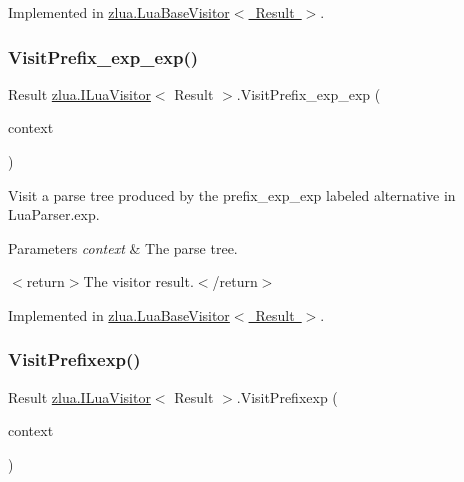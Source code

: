 Implemented in \mbox{\hyperlink{classzlua_1_1_lua_base_visitor_a2dc2a658f068fc6064d256d3c19b1b0d}{zlua.\+Lua\+Base\+Visitor$<$ Result $>$}}.

\mbox{\label{interfacezlua_1_1_i_lua_visitor_a8183a0ec15a6a77848310e5ea034e45d}} 
\subsubsection{\texorpdfstring{Visit\+Prefix\+\_\+exp\+\_\+exp()}{VisitPrefix\_exp\_exp()}}
{\footnotesize\ttfamily Result \mbox{\hyperlink{interfacezlua_1_1_i_lua_visitor}{zlua.\+I\+Lua\+Visitor}}$<$ Result $>$.Visit\+Prefix\+\_\+exp\+\_\+exp (\begin{DoxyParamCaption}\item[{\mbox{[}\+Not\+Null\mbox{]} \mbox{\hyperlink{classzlua_1_1_lua_parser_1_1_prefix__exp__exp_context}{Lua\+Parser.\+Prefix\+\_\+exp\+\_\+exp\+Context}}}]{context }\end{DoxyParamCaption})}



Visit a parse tree produced by the {\ttfamily prefix\+\_\+exp\+\_\+exp} labeled alternative in Lua\+Parser.\+exp. 


\begin{DoxyParams}{Parameters}
{\em context} & The parse tree.\\
\hline
\end{DoxyParams}
$<$return$>$The visitor result.$<$/return$>$ 

Implemented in \mbox{\hyperlink{classzlua_1_1_lua_base_visitor_a77ce0adce8dcce58ae649a008ff905bc}{zlua.\+Lua\+Base\+Visitor$<$ Result $>$}}.

\mbox{\label{interfacezlua_1_1_i_lua_visitor_a76880eb7fdd84285caa8759ecabd8aca}} 
\subsubsection{\texorpdfstring{Visit\+Prefixexp()}{VisitPrefixexp()}}
{\footnotesize\ttfamily Result \mbox{\hyperlink{interfacezlua_1_1_i_lua_visitor}{zlua.\+I\+Lua\+Visitor}}$<$ Result $>$.Visit\+Prefixexp (\begin{DoxyParamCaption}\item[{\mbox{[}\+Not\+Null\mbox{]} \mbox{\hyperlink{classzlua_1_1_lua_parser_1_1_prefixexp_context}{Lua\+Parser.\+Prefixexp\+Context}}}]{context }\end{DoxyParamCaption})}



